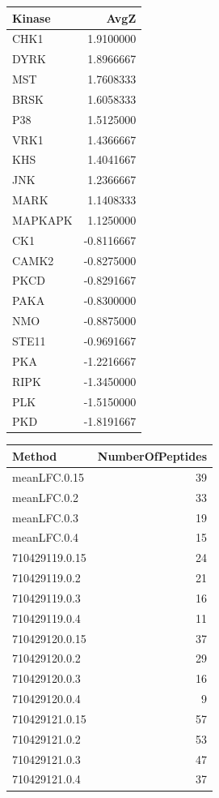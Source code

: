 \documentclass[
  letterpaper,
  DIV=11,
  numbers=noendperiod]{scrreport}
\begin{document}
\begin{longtable}[]{@{}lr@{}}
\toprule()
Kinase & AvgZ \\
\midrule()
\endhead
CHK1 & 1.9100000 \\
DYRK & 1.8966667 \\
MST & 1.7608333 \\
BRSK & 1.6058333 \\
P38 & 1.5125000 \\
VRK1 & 1.4366667 \\
KHS & 1.4041667 \\
JNK & 1.2366667 \\
MARK & 1.1408333 \\
MAPKAPK & 1.1250000 \\
CK1 & -0.8116667 \\
CAMK2 & -0.8275000 \\
PKCD & -0.8291667 \\
PAKA & -0.8300000 \\
NMO & -0.8875000 \\
STE11 & -0.9691667 \\
PKA & -1.2216667 \\
RIPK & -1.3450000 \\
PLK & -1.5150000 \\
PKD & -1.8191667 \\
\bottomrule()
\end{longtable}

\begin{longtable}[]{@{}lr@{}}
\toprule()
Method & NumberOfPeptides \\
\midrule()
\endhead
meanLFC.0.15 & 39 \\
meanLFC.0.2 & 33 \\
meanLFC.0.3 & 19 \\
meanLFC.0.4 & 15 \\
710429119.0.15 & 24 \\
710429119.0.2 & 21 \\
710429119.0.3 & 16 \\
710429119.0.4 & 11 \\
710429120.0.15 & 37 \\
710429120.0.2 & 29 \\
710429120.0.3 & 16 \\
710429120.0.4 & 9 \\
710429121.0.15 & 57 \\
710429121.0.2 & 53 \\
710429121.0.3 & 47 \\
710429121.0.4 & 37 \\
\bottomrule()
\end{longtable}
\end{document}
